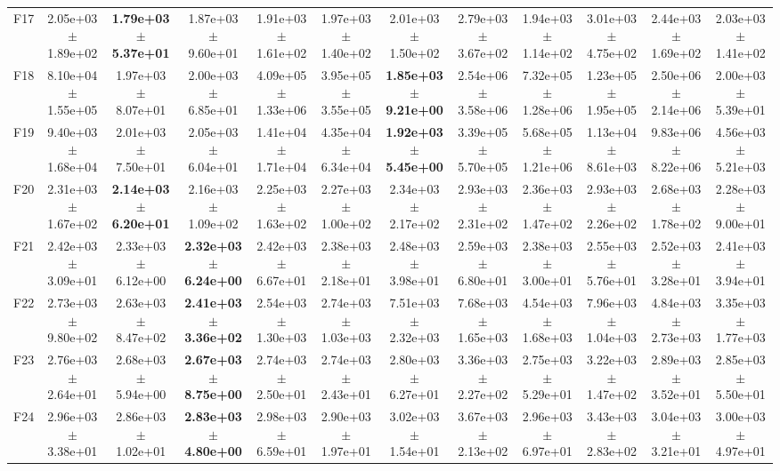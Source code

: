 \begin{table}
{\begin{tabular}{lccccccccccc}
F17 & 2.05e+03 $\pm$ 1.89e+02 & \textbf{1.79e+03 $\pm$ 5.37e+01} & 1.87e+03 $\pm$ 9.60e+01 & 1.91e+03 $\pm$ 1.61e+02 & 1.97e+03 $\pm$ 1.40e+02 & 2.01e+03 $\pm$ 1.50e+02 & 2.79e+03 $\pm$ 3.67e+02 & 1.94e+03 $\pm$ 1.14e+02 & 3.01e+03 $\pm$ 4.75e+02 & 2.44e+03 $\pm$ 1.69e+02 & 2.03e+03 $\pm$ 1.41e+02 \\
F18 & 8.10e+04 $\pm$ 1.55e+05 & 1.97e+03 $\pm$ 8.07e+01 & 2.00e+03 $\pm$ 6.85e+01 & 4.09e+05 $\pm$ 1.33e+06 & 3.95e+05 $\pm$ 3.55e+05 & \textbf{1.85e+03 $\pm$ 9.21e+00} & 2.54e+06 $\pm$ 3.58e+06 & 7.32e+05 $\pm$ 1.28e+06 & 1.23e+05 $\pm$ 1.95e+05 & 2.50e+06 $\pm$ 2.14e+06 & 2.00e+03 $\pm$ 5.39e+01 \\
F19 & 9.40e+03 $\pm$ 1.68e+04 & 2.01e+03 $\pm$ 7.50e+01 & 2.05e+03 $\pm$ 6.04e+01 & 1.41e+04 $\pm$ 1.71e+04 & 4.35e+04 $\pm$ 6.34e+04 & \textbf{1.92e+03 $\pm$ 5.45e+00} & 3.39e+05 $\pm$ 5.70e+05 & 5.68e+05 $\pm$ 1.21e+06 & 1.13e+04 $\pm$ 8.61e+03 & 9.83e+06 $\pm$ 8.22e+06 & 4.56e+03 $\pm$ 5.21e+03 \\
F20 & 2.31e+03 $\pm$ 1.67e+02 & \textbf{2.14e+03 $\pm$ 6.20e+01} & 2.16e+03 $\pm$ 1.09e+02 & 2.25e+03 $\pm$ 1.63e+02 & 2.27e+03 $\pm$ 1.00e+02 & 2.34e+03 $\pm$ 2.17e+02 & 2.93e+03 $\pm$ 2.31e+02 & 2.36e+03 $\pm$ 1.47e+02 & 2.93e+03 $\pm$ 2.26e+02 & 2.68e+03 $\pm$ 1.78e+02 & 2.28e+03 $\pm$ 9.00e+01 \\
F21 & 2.42e+03 $\pm$ 3.09e+01 & 2.33e+03 $\pm$ 6.12e+00 & \textbf{2.32e+03 $\pm$ 6.24e+00} & 2.42e+03 $\pm$ 6.67e+01 & 2.38e+03 $\pm$ 2.18e+01 & 2.48e+03 $\pm$ 3.98e+01 & 2.59e+03 $\pm$ 6.80e+01 & 2.38e+03 $\pm$ 3.00e+01 & 2.55e+03 $\pm$ 5.76e+01 & 2.52e+03 $\pm$ 3.28e+01 & 2.41e+03 $\pm$ 3.94e+01 \\
F22 & 2.73e+03 $\pm$ 9.80e+02 & 2.63e+03 $\pm$ 8.47e+02 & \textbf{2.41e+03 $\pm$ 3.36e+02} & 2.54e+03 $\pm$ 1.30e+03 & 2.74e+03 $\pm$ 1.03e+03 & 7.51e+03 $\pm$ 2.32e+03 & 7.68e+03 $\pm$ 1.65e+03 & 4.54e+03 $\pm$ 1.68e+03 & 7.96e+03 $\pm$ 1.04e+03 & 4.84e+03 $\pm$ 2.73e+03 & 3.35e+03 $\pm$ 1.77e+03 \\
F23 & 2.76e+03 $\pm$ 2.64e+01 & 2.68e+03 $\pm$ 5.94e+00 & \textbf{2.67e+03 $\pm$ 8.75e+00} & 2.74e+03 $\pm$ 2.50e+01 & 2.74e+03 $\pm$ 2.43e+01 & 2.80e+03 $\pm$ 6.27e+01 & 3.36e+03 $\pm$ 2.27e+02 & 2.75e+03 $\pm$ 5.29e+01 & 3.22e+03 $\pm$ 1.47e+02 & 2.89e+03 $\pm$ 3.52e+01 & 2.85e+03 $\pm$ 5.50e+01 \\
F24 & 2.96e+03 $\pm$ 3.38e+01 & 2.86e+03 $\pm$ 1.02e+01 & \textbf{2.83e+03 $\pm$ 4.80e+00} & 2.98e+03 $\pm$ 6.59e+01 & 2.90e+03 $\pm$ 1.97e+01 & 3.02e+03 $\pm$ 1.54e+01 & 3.67e+03 $\pm$ 2.13e+02 & 2.96e+03 $\pm$ 6.97e+01 & 3.43e+03 $\pm$ 2.83e+02 & 3.04e+03 $\pm$ 3.21e+01 & 3.00e+03 $\pm$ 4.97e+01 \\

\end{tabular}}
\end{table}
